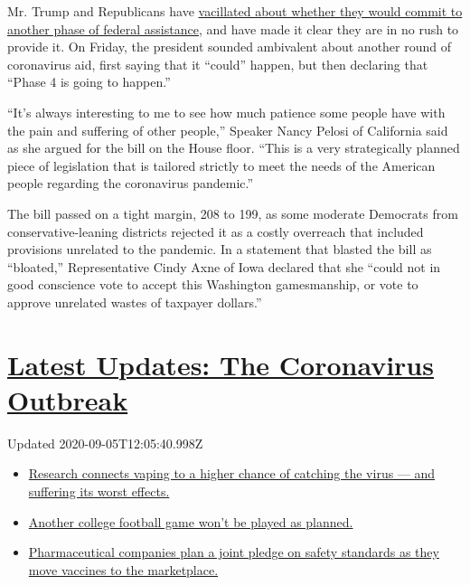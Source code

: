 Mr. Trump and Republicans have
\href{https://www.nytimes3xbfgragh.onion/2020/05/15/us/coronavirus-republicans-blowback-aid.html}{vacillated
about whether they would commit to another phase of federal assistance},
and have made it clear they are in no rush to provide it. On Friday, the
president sounded ambivalent about another round of coronavirus aid,
first saying that it ``could'' happen, but then declaring that ``Phase 4
is going to happen.''

``It's always interesting to me to see how much patience some people
have with the pain and suffering of other people,'' Speaker Nancy Pelosi
of California said as she argued for the bill on the House floor. ``This
is a very strategically planned piece of legislation that is tailored
strictly to meet the needs of the American people regarding the
coronavirus pandemic.''

The bill passed on a tight margin, 208 to 199, as some moderate
Democrats from conservative-leaning districts rejected it as a costly
overreach that included provisions unrelated to the pandemic. In a
statement that blasted the bill as ``bloated,'' Representative Cindy
Axne of Iowa declared that she ``could not in good conscience vote to
accept this Washington gamesmanship, or vote to approve unrelated wastes
of taxpayer dollars.''

\hypertarget{latest-updates-the-coronavirus-outbreak}{%
\section{\texorpdfstring{\href{https://www.nytimes3xbfgragh.onion/2020/09/04/world/covid-19-coronavirus.html?action=click\&pgtype=Article\&state=default\&region=MAIN_CONTENT_1\&context=storylines_live_updates}{Latest
Updates: The Coronavirus
Outbreak}}{Latest Updates: The Coronavirus Outbreak}}\label{latest-updates-the-coronavirus-outbreak}}

Updated 2020-09-05T12:05:40.998Z

\begin{itemize}
\tightlist
\item
  \href{https://www.nytimes3xbfgragh.onion/2020/09/04/world/covid-19-coronavirus.html?action=click\&pgtype=Article\&state=default\&region=MAIN_CONTENT_1\&context=storylines_live_updates\#link-1654f6ad}{Research
  connects vaping to a higher chance of catching the virus --- and
  suffering its worst effects.}
\item
  \href{https://www.nytimes3xbfgragh.onion/2020/09/04/world/covid-19-coronavirus.html?action=click\&pgtype=Article\&state=default\&region=MAIN_CONTENT_1\&context=storylines_live_updates\#link-52e4198a}{Another
  college football game won't be played as planned.}
\item
  \href{https://www.nytimes3xbfgragh.onion/2020/09/04/world/covid-19-coronavirus.html?action=click\&pgtype=Article\&state=default\&region=MAIN_CONTENT_1\&context=storylines_live_updates\#link-181cef0}{Pharmaceutical
  companies plan a joint pledge on safety standards as they move
  vaccines to the marketplace.}
\end{itemize}

